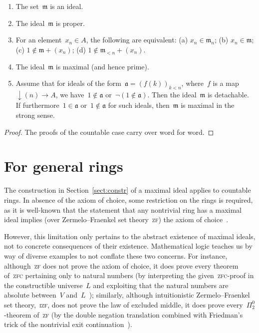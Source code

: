 \documentclass[envcountsect,envcountsame,runningheads]{llncs}
\newcommand{\aaa}{\mathfrak{a}}
\newcommand{\mmm}{\mathfrak{m}}
\renewcommand{\_}{\mathpunct{.}\,}
\begin{document}
\begin{proposition}\begin{enumerate}
\item The set~$\mmm$ is an ideal.
\item The ideal~$\mmm$ is proper.
\item For an element~$x_n \in A$, the following are equivalent: (a) $x_n \in
\mmm_n$; (b) $x_n \in \mmm$; (c) $1 \not\in \mmm + (x_n)$; (d) $1 \not \in \mmm_{<n} + (x_n)$.
\item The ideal~$\mmm$ is maximal (and hence prime).
\item Assume that for ideals of the form~$\aaa = (f(k))_{k < n}$, where~$f$
is a map~${{\downarrow}(n)} \to A$, we have~$1 \not\in \aaa$ or~$\neg(1
\not\in \aaa)$. Then the ideal~$\mmm$ is detachable. If furthermore~$1 \in \aaa$
or~$1 \not\in \aaa$ for such ideals, then~$\mmm$ is maximal in the
strong sense.
\end{enumerate}
\end{proposition}

\begin{proof}The proofs of the countable case carry over word for word.
\end{proof}


\section{For general rings}
\label{sect:wlog}

The construction in Section~\ref{sect:constr} of a maximal ideal applies to
countable rings. In absence of the axiom of choice, some restriction on the
rings is required, as it is well-known that the statement that any nontrivial
ring has a maximal ideal implies (over Zermelo--Fraenkel set
theory~\textsc{zf}) the axiom of choice~\cite{scott:prime-ideals,hodges:krull,banaschewski:krull,erne:krull,howard-rubin:ac}.

However, this limitation only pertains to the abstract existence of maximal
ideals, not to concrete consequences of their existence. Mathematical
logic teaches us by way of diverse examples to not conflate these two concerns. For
instance, although~\textsc{zf} does not prove the axiom of choice, it does
prove every theorem of~\textsc{zfc} pertaining only to natural numbers (by
interpreting the given~\textsc{zfc}-proof in the constructible universe~$L$
and exploiting that the natural numbers are absolute between~$V$
and~$L$~\cite{goedel:ac-gch,schoenfield:predicativity}); similarly, although intuitionistic Zermelo--Fraenkel set
theory,~\textsc{izf}, does not prove the law of excluded middle, it does prove
every~$\Pi^0_2$-theorem of~\textsc{zf} (by the double negation translation
combined with Friedman's trick of the nontrivial exit continuation~\cite{friedman:double-negation-translation}).
\end{document}
